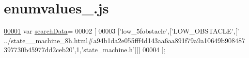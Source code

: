 \hypertarget{enumvalues__6_8js_source}{}\section{enumvalues\+\_.\+js}
\label{enumvalues__6_8js_source}

\begin{DoxyCode}
\hypertarget{enumvalues__6_8js_source.tex_l00001}{}\hyperlink{enumvalues__6_8js_ad01a7523f103d6242ef9b0451861231e}{00001} var \hyperlink{enumvalues__6_8js_ad01a7523f103d6242ef9b0451861231e}{searchData}=
00002 [
00003   [\textcolor{stringliteral}{'low\_5fobstacle'},[\textcolor{stringliteral}{'LOW\_OBSTACLE'},[\textcolor{stringliteral}{'
      ../state\_\_machine\_8h.html#a94b1da2e055fff4d143aa6aa891f79a9a10649b908487397730b45977dd2ceb20'},1,\textcolor{stringliteral}{'state\_machine.h'}]]]
00004 ];
\end{DoxyCode}
